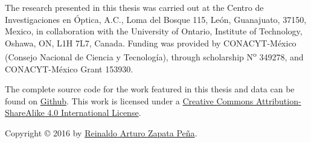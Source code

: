 \begin{titlingpage*}

\let\cleardoublepage\clearpage

\null
\vfill
\parbox{0.7\textwidth}{
The research presented in this thesis was carried out at the Centro de
Investigaciones en \'Optica, A.C., Loma del Bosque 115, Le\'on, Guanajuato,
37150, Mexico, in collaboration with the University of Ontario, Institute of
Technology, Oshawa, ON, L1H 7L7, Canada. Funding was provided by
CONACYT-M\'exico (Consejo Nacional de Ciencia y Tecnolog\'ia), through
scholarship {\color{red} N\textsuperscript{o} 349278, and CONACYT-M\'exico
Grant 153930}.

\vspace{0.5cm}

The complete source code for the work featured in this thesis and data can be
found on \href{https://github.com/reinaldo-z/thesis-phd}{Github}. {\color{red}
This work is licensed under a \href{http://creativecommons.org/licenses/by-
sa/4.0/}{Creative Commons Attribution-ShareAlike 4.0 International License}}.



\vspace{0.5cm}

Copyright {\copyright{}} 2016 by 
\href{mailto:reinaldo.zapata.p@gmail.com}{Reinaldo Arturo Zapata Pe\~na}.
}

\end{titlingpage*}
